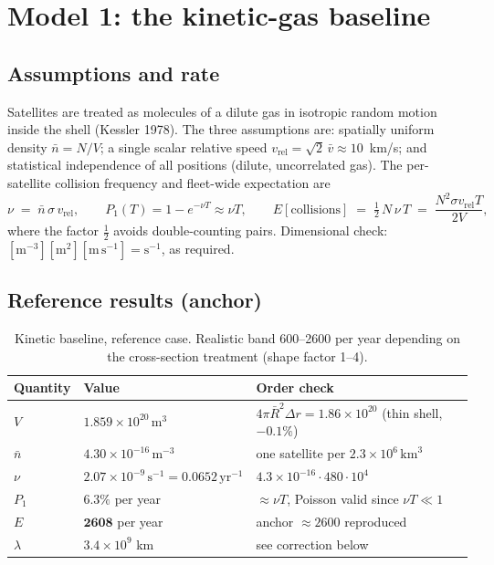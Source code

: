 \documentclass[11pt,a4paper]{article}
\newcommand{\vrel}{v_{\mathrm{rel}}}
\newcommand{\Rbar}{\bar{R}}
\newcommand{\nbar}{\bar{n}}
\begin{document}
\section{Model 1: the kinetic-gas baseline}

\subsection{Assumptions and rate}

Satellites are treated as molecules of a dilute gas in isotropic random motion inside
the shell (Kessler 1978). The three assumptions are: spatially uniform density
$\nbar = N/V$; a single scalar relative speed $\vrel = \sqrt{2}\,\bar v \approx
10$~km/s; and statistical independence of all positions (dilute, uncorrelated gas).
The per-satellite collision frequency and fleet-wide expectation are
\begin{equation}
\nu \;=\; \nbar\,\sigma\,\vrel, \qquad
P_1(T) = 1 - e^{-\nu T} \approx \nu T, \qquad
E[\mathrm{collisions}] \;=\; \tfrac12\,N\,\nu\,T \;=\; \frac{N^2 \sigma \vrel T}{2V},
\end{equation}
where the factor $\tfrac12$ avoids double-counting pairs.
Dimensional check: $[\mathrm{m}^{-3}][\mathrm{m}^2][\mathrm{m\,s}^{-1}] =
\mathrm{s}^{-1}$, as required.

\subsection{Reference results (anchor)}

\begin{table}[h]\centering\small
\begin{tabular}{lll}
\toprule
Quantity & Value & Order check \\
\midrule
$V$ & $1.859\times10^{20}\,\mathrm{m}^3$ & $4\pi \Rbar^2 \Delta r = 1.86\times10^{20}$ (thin shell, $-0.1\%$) \\
$\nbar$ & $4.30\times10^{-16}\,\mathrm{m}^{-3}$ & one satellite per $2.3\times10^{6}\,\mathrm{km}^3$ \\
$\nu$ & $2.07\times10^{-9}\,\mathrm{s}^{-1} = 0.0652\,\mathrm{yr}^{-1}$ & $4.3\times10^{-16}\cdot480\cdot10^4$ \\
$P_1$ & $6.3\%$ per year & $\approx \nu T$, Poisson valid since $\nu T \ll 1$ \\
$E$ & $\mathbf{2608}$ per year & anchor $\approx 2600$ reproduced \\
$\lambda$ & $3.4\times10^{9}$ km & see correction below \\
\bottomrule
\end{tabular}
\caption{Kinetic baseline, reference case. Realistic band 600--2600 per year
depending on the cross-section treatment (shape factor 1--4).}
\end{table}
\end{document}
